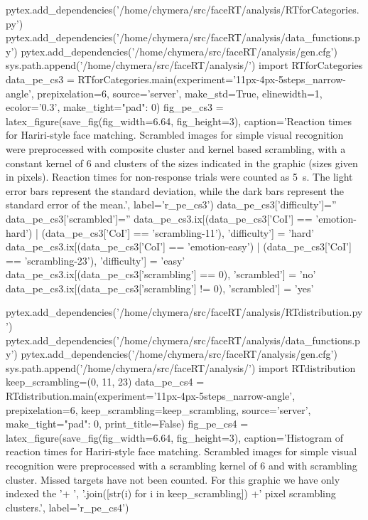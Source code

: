 \begin{pycode}[pe_cs3]
pytex.add_dependencies('/home/chymera/src/faceRT/analysis/RTforCategories.py')
pytex.add_dependencies('/home/chymera/src/faceRT/analysis/data_functions.py')
pytex.add_dependencies('/home/chymera/src/faceRT/analysis/gen.cfg')
sys.path.append('/home/chymera/src/faceRT/analysis/')
import RTforCategories
data_pe_cs3 = RTforCategories.main(experiment='11px-4px-5steps_narrow-angle', prepixelation=6, source='server', make_std=True, elinewidth=1, ecolor='0.3', make_tight={"pad": 0})
fig_pe_cs3 = latex_figure(save_fig(fig_width=6.64, fig_height=3), caption='Reaction times for Hariri-style face matching. Scrambled images for simple visual recognition were preprocessed with composite cluster and kernel based scrambling, with a constant kernel of \SI{6}{\pixel} and clusters of the sizes indicated in the graphic (sizes given in pixels). Reaction times for non-response trials were counted as \SI{5}{\second}. The light error bars represent the standard deviation, while the dark bars represent the standard error of the mean.', label='r_pe_cs3')
data_pe_cs3['difficulty']=''
data_pe_cs3['scrambled']=''
data_pe_cs3.ix[(data_pe_cs3['CoI'] == 'emotion-hard') | (data_pe_cs3['CoI'] == 'scrambling-11'), 'difficulty'] = 'hard'
data_pe_cs3.ix[(data_pe_cs3['CoI'] == 'emotion-easy') | (data_pe_cs3['CoI'] == 'scrambling-23'), 'difficulty'] = 'easy'
data_pe_cs3.ix[(data_pe_cs3['scrambling'] == 0), 'scrambled'] = 'no'
data_pe_cs3.ix[(data_pe_cs3['scrambling'] != 0), 'scrambled'] = 'yes'
\end{pycode}
\begin{pycode}[pe_cs4]
pytex.add_dependencies('/home/chymera/src/faceRT/analysis/RTdistribution.py')
pytex.add_dependencies('/home/chymera/src/faceRT/analysis/data_functions.py')
pytex.add_dependencies('/home/chymera/src/faceRT/analysis/gen.cfg')
sys.path.append('/home/chymera/src/faceRT/analysis/')
import RTdistribution
keep_scrambling=(0, 11, 23)
data_pe_cs4 = RTdistribution.main(experiment='11px-4px-5steps_narrow-angle', prepixelation=6, keep_scrambling=keep_scrambling, source='server', make_tight={"pad": 0}, print_title=False)
fig_pe_cs4 = latex_figure(save_fig(fig_width=6.64, fig_height=3), caption='Histogram of reaction times for Hariri-style face matching. Scrambled images for simple visual recognition were preprocessed with a scrambling kernel of \SI{6}{\pixel} and with scrambling cluster. Missed targets have not been counted. For this graphic we have only indexed the '+ ', '.join([str(i) for i in keep_scrambling]) +' pixel scrambling clusters.', label='r_pe_cs4')
\end{pycode}
